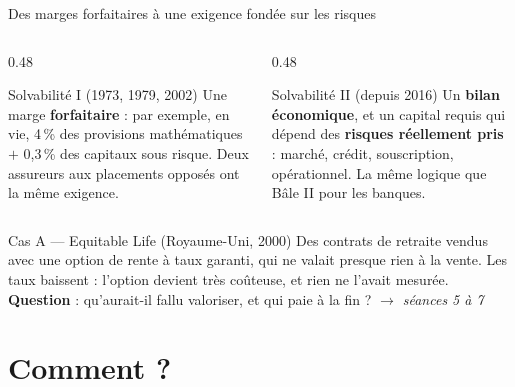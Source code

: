 \documentclass[10pt,aspectratio=169]{beamer}
\newenvironment{cas}[2]{\begin{exampleblock}{Cas #1 --- #2}}{\end{exampleblock}}
\begin{document}
\begin{frame}{Des marges forfaitaires à une exigence fondée sur les risques}
\begin{columns}[T]
\begin{column}{0.48\textwidth}
\begin{block}{Solvabilité I (1973, 1979, 2002)}
Une marge \textbf{forfaitaire} : par exemple, en vie, 4\,\% des provisions mathématiques
$+$ 0,3\,\% des capitaux sous risque. Deux assureurs aux placements opposés ont la même exigence.
\end{block}
\end{column}
\begin{column}{0.48\textwidth}
\begin{block}{Solvabilité II (depuis 2016)}
Un \textbf{bilan économique}, et un capital requis qui dépend des \textbf{risques réellement
pris} : marché, crédit, souscription, opérationnel. La même logique que Bâle II pour les banques.
\end{block}
\end{column}
\end{columns}
\vspace{0.4cm}
\begin{cas}{A}{Equitable Life (Royaume-Uni, 2000)}
Des contrats de retraite vendus avec une option de rente à taux garanti, qui ne valait presque
rien à la vente. Les taux baissent : l'option devient très coûteuse, et rien ne l'avait mesurée.
\textbf{Question} : qu'aurait-il fallu valoriser, et qui paie à la fin ? \hfill
\emph{$\to$ séances 5 à 7}
\end{cas}
\end{frame}

\section{Comment ?}
\end{document}
